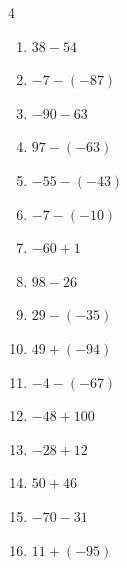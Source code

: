 \begin{multicols}{4}
\begin{enumerate}
        \phantom{$=-95$}

  \item $38-54$

        \phantom{$=-16$}

  \item $-7-(-87)$

        \phantom{$=80$}

  \item $-90-63$

        \phantom{$=-153$}

  \item $97-(-63)$

        \phantom{$=160$}

  \item $-55-(-43)$

        \phantom{$=-12$}

  \item $-7-(-10)$

        \phantom{$=3$}

\columnbreak %

  \item $-60+1$

        \phantom{$=-59$}

  \item $98-26$

        \phantom{$=72$}

  \item $29-(-35)$

        \phantom{$=64$}

  \item $49+(-94)$

        \phantom{$=-45$}

  \item $-4-(-67)$

        \phantom{$=63$}

  \item $-48+100$

        \phantom{$=52$}

  \item $-28+12$

        \phantom{$=-16$}

  \item $50+46$

        \phantom{$=96$}

  \item $-70-31$

        \phantom{$=-101$}

  \item $11+(-95)$


\end{enumerate}
\end{multicols}
